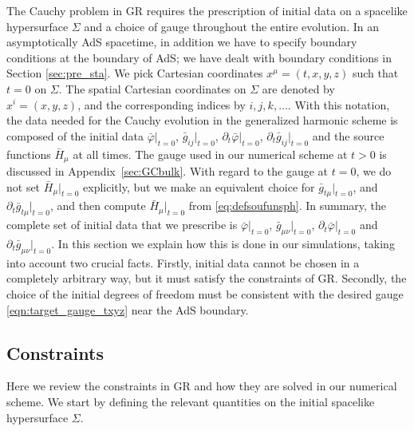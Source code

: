 \documentclass[aps,letterpaper,twocolumn,nofootinbib]{revtex4}
\numberwithin{equation}{section}
\begin{document}
The Cauchy problem in GR requires the prescription of initial data on a spacelike hypersurface $\Sigma$ and a choice of gauge throughout the entire evolution. In an asymptotically AdS spacetime, in addition we have to specify boundary conditions at the boundary of AdS; we have dealt with boundary conditions in Section \ref{sec:pre_sta}. We pick Cartesian coordinates $x^\mu=(t,x,y,z)$ such that $t=0$ on $\Sigma$. The spatial Cartesian coordinates on $\Sigma$ are denoted by $x^i=(x,y,z)$, and the corresponding indices by $i,j,k,\dots$. 
With this notation, the data needed for the Cauchy evolution in the generalized harmonic scheme is composed of the initial data $\bar{\varphi}|_{t=0}$, $\bar{g}_{ij}|_{t=0}$, $\partial_t\bar{\varphi}|_{t=0} $, $\partial_t\bar{g}_{ij}|_{t=0}$ and the source functions $\bar{H}_\mu$ at all times. The gauge used in our numerical scheme at $t>0$ is discussed in Appendix~\ref{sec:GCbulk}. With regard to the gauge at $t=0$, we do not set $\bar{H}_\mu|_{t=0}$ explicitly, but we make an equivalent choice for $\bar{g}_{t\mu}|_{t=0}$, and $\partial_t\bar{g}_{t\mu}|_{t=0}$, and then compute $\bar{H}_\mu|_{t=0}$ from \eqref{eq:defsoufunsph}.
In summary, the complete set of initial data that we prescribe is $\bar{\varphi}|_{t=0}$, $\bar{g}_{\mu\nu}|_{t=0}$, $\partial_t\bar{\varphi}|_{t=0}$ and $\partial_t\bar{g}_{\mu\nu}|_{t=0}$. In this section we explain how this is done in our simulations, taking into account two crucial facts. Firstly, initial data cannot be chosen in a completely arbitrary way, but it must satisfy the constraints of GR. Secondly, the choice of the initial degrees of freedom must be consistent with the desired gauge \eqref{eqn:target_gauge_txyz} near the AdS boundary. 

\subsection{Constraints}
\label{sec:constr}

Here we review the constraints in GR and how they are solved in our numerical scheme.
We start by defining the relevant quantities on the initial spacelike hypersurface $\Sigma$. 
\end{document}
